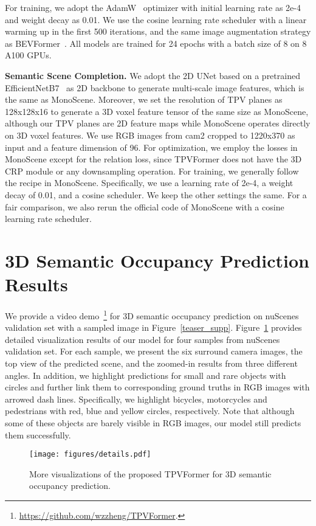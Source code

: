 \documentclass[10pt,twocolumn,letterpaper]{article}
\begin{document}
For training, we adopt the AdamW~\cite{adamw} optimizer with initial learning rate as 2e-4 and weight decay as 0.01.
We use the cosine learning rate scheduler with a linear warming up in the first 500 iterations, and the same image augmentation strategy as BEVFormer~\cite{bevformer}.
All models are trained for 24 epochs with a batch size of 8 on 8 A100 GPUs.

\textbf{Semantic Scene Completion.}
We adopt the 2D UNet based on a pretrained EfficientNetB7~\cite{efficientnet} as 2D backbone to generate multi-scale image features, which is the same as MonoScene.
Moreover, we set the resolution of TPV planes as 128x128x16 to generate a 3D voxel feature tensor of the same size as MonoScene, although our TPV planes are 2D feature maps while MonoScene operates directly on 3D voxel features.
We use RGB images from cam2 cropped to 1220x370 as input and a feature dimension of 96.
For optimization, we employ the losses in MonoScene except for the relation loss, since TPVFormer does not have the 3D CRP module or any downsampling operation.
For training, we generally follow the recipe in MonoScene.
Specifically, we use a learning rate of 2e-4, a weight decay of 0.01, and a cosine scheduler.
We keep the other settings the same.
For a fair comparison, we also rerun the official code of MonoScene with a cosine learning rate scheduler.


\section{3D Semantic Occupancy Prediction Results} \label{app:occupancy}
We provide a video demo~\footnote{\url{https://github.com/wzzheng/TPVFormer}.} for 3D semantic occupancy prediction on nuScenes validation set with a sampled image in Figure~\ref{teaser_supp}.
Figure~\ref{fig: supp details} provides detailed visualization results of our model for four samples from nuScenes validation set.
For each sample, we present the six surround camera images, the top view of the predicted scene, and the zoomed-in results from three different angles. 
In addition, we highlight predictions for small and rare objects with circles and further link them to corresponding ground truths in RGB images with arrowed dash lines.
Specifically, we highlight bicycles, motorcycles and pedestrians with red, blue and yellow circles, respectively.
Note that although some of these objects are barely visible in RGB images, our model still predicts them successfully.


\begin{figure}[t]
\centering
\texttt{[image: figures/details.pdf]}
\vspace{-7mm}
\caption{More visualizations of the proposed TPVFormer for 3D semantic occupancy prediction.
}
\label{fig: supp details}
\vspace{-5mm}
\end{figure}
\end{document}
